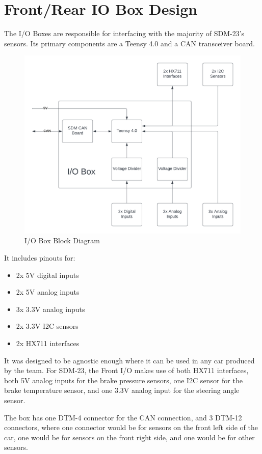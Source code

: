 \section{Front/Rear IO Box Design}
The I/O Boxes are responsible for interfacing with the majority of SDM-23's sensors.
Its primary components are a Teensy 4.0 and a CAN transceiver board.
\begin{figure}
    \centering
    \includegraphics[width=5in]{images/SDM-23 IO Box Block Diagram.png}
    \caption{I/O Box Block Diagram}
    \label{fig:sdm23ioboxblock}
\end{figure}
It includes pinouts for:
\begin{itemize}
    \item 2x 5V digital inputs
    \item 2x 5V analog inputs
    \item 3x 3.3V analog inputs
    \item 2x 3.3V I2C sensors
    \item 2x HX711 interfaces
\end{itemize}
It was designed to be agnostic enough where it can be used in any car produced by the team.
For SDM-23, the Front I/O makes use of both HX711 interfaces, both 5V analog inputs for the brake pressure sensors, one I2C sensor for the brake temperature sensor, and one 3.3V analog input for the steering angle sensor.
\vspace{1em}

The box has one DTM-4 connector for the CAN connection, and 3 DTM-12 connectors, where one connector would be for sensors on the front left side of the car, one would be for sensors on the front right side, and one would be for other sensors.

